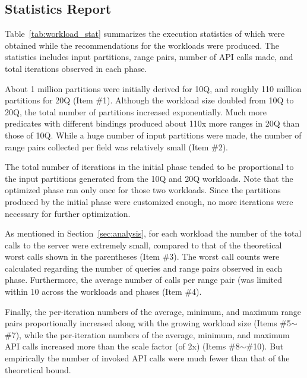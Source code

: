 \documentclass[runningheads]{comsis2}
\begin{document}
\subsection{Statistics Report}
\label{sec:stat}

Table~\ref{tab:workload_stat} summarizes the execution statistics of 
which were obtained while the recommendations for the \hbox{workloads} were produced. 
The statistics includes input partitions, 
range pairs, number of API calls made, and total iterations 
observed in each phase. 

About 1 million partitions were initially derived for 10Q, and roughly 110 million partitions for 20Q (Item \#1). 
Although the workload size doubled from 10Q to 20Q, the total number of partitions increased exponentially. 
Much more predicates with different bindings produced about 110x more ranges in 20Q than those of 10Q. 
While a huge number of input partitions were made, the number of range pairs collected per field was relatively small 
(Item \#2). 

The total number of iterations in the initial phase 
tended to be proportional to the input partitions 
generated from the 10Q and 20Q workloads. 
Note that the optimized phase ran only once for those two workloads.
Since the partitions produced by the initial phase were customized enough,
no more iterations were necessary for further optimization. 

As mentioned in Section~\ref{sec:analysis}, for each workload the number of the total calls 
to the server were extremely small, compared to that of the theoretical worst calls shown in the parentheses (Item \#3). 
The worst call counts were calculated regarding the number of queries and range pairs observed in each phase. 
Furthermore, the average number of calls per range pair (was limited within 10 across the workloads and phases (Item \#4). 

Finally,  the per-iteration numbers of the average, minimum, and maximum range pairs proportionally 
increased along with the growing workload size (Items \#5$\sim$\#7), while 
the per-iteration numbers of the average, minimum, and maximum API calls 
increased more than the scale factor (of 2x) (Items \#8$\sim$\#10). 
But empirically the number of invoked API calls were much fewer than that of the theoretical bound.
\end{document}
